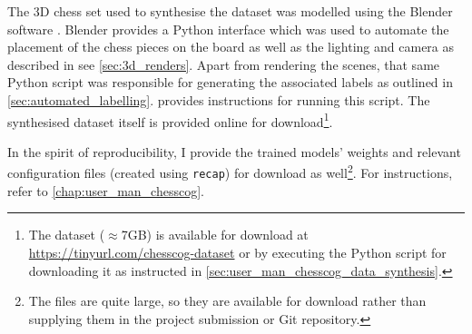 \documentclass[../report.tex]{subfiles}
\begin{document}
The 3D chess set used to synthesise the dataset was modelled using the Blender software \cite{blender}.
Blender provides a Python interface which was used to automate the placement of the chess pieces on the board as well as the lighting and camera as described in see \cref{sec:3d_renders}.
Apart from rendering the scenes, that same Python script was responsible for generating the associated labels as outlined in \cref{sec:automated_labelling}.
 provides instructions for running this script.
The synthesised dataset itself is provided online for download\footnote{The dataset ($\approx$7GB) is available for download at \url{https://tinyurl.com/chesscog-dataset} or by executing the Python script for downloading it as instructed in \cref{sec:user_man_chesscog_data_synthesis}.}.

In the spirit of reproducibility, I provide the trained models' weights and relevant configuration files (created using \texttt{recap}) for download as well\footnote{The files are quite large, so they are available for download rather than supplying them in the project submission or Git repository.}.
For instructions, refer to \cref{chap:user_man_chesscog}.
\end{document}
